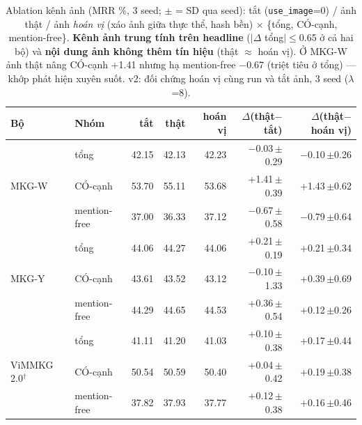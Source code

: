 \begin{table}[t]
\centering
\footnotesize
\setlength{\tabcolsep}{5pt}
\caption{Ablation kênh ảnh (MRR \%, 3 seed; $\pm$ = SD qua seed): tắt (\texttt{use\_image}=0) / ảnh
thật / ảnh \emph{hoán vị} (xáo ảnh giữa thực thể, hash bền) $\times$ \{tổng, CÓ-cạnh, mention-free\}.
\textbf{Kênh ảnh trung tính trên headline} ($|\Delta$ tổng$|\le$0.65 ở cả hai bộ) và \textbf{nội dung
ảnh không thêm tín hiệu} (thật $\approx$ hoán vị). Ở MKG-W ảnh thật nâng CÓ-cạnh +1.41 nhưng hạ
mention-free $-$0.67 (triệt tiêu ở tổng) --- khớp phát hiện xuyên suốt. v2: đối chứng hoán vị cùng run và tắt ảnh, 3 seed ($\lambda$=8).}
\label{tab:anh}
\begin{tabular}{l l r r r r r}
\toprule
Bộ & Nhóm & tắt & thật & hoán vị & $\Delta$(thật$-$tắt) & $\Delta$(thật$-$hoán vị) \\
\midrule
\multirow{3}{*}{MKG-W} & tổng & 42.15 & 42.13 & 42.23 & $-$0.03\,$\pm$0.29 & $-$0.10\,$\pm$0.26 \\
 & CÓ-cạnh & 53.70 & 55.11 & 53.68 & +1.41\,$\pm$0.39 & +1.43\,$\pm$0.62 \\
 & mention-free & 37.00 & 36.33 & 37.12 & $-$0.67\,$\pm$0.58 & $-$0.79\,$\pm$0.64 \\
\midrule
\multirow{3}{*}{MKG-Y} & tổng & 44.06 & 44.27 & 44.06 & +0.21\,$\pm$0.19 & +0.21\,$\pm$0.34 \\
 & CÓ-cạnh & 43.61 & 43.52 & 43.12 & $-$0.10\,$\pm$1.33 & +0.39\,$\pm$0.69 \\
 & mention-free & 44.29 & 44.65 & 44.53 & +0.36\,$\pm$0.54 & +0.12\,$\pm$0.26 \\
\midrule
\multirow{3}{*}{ViMMKG 2.0$^{\dagger}$} & tổng & 41.11 & 41.20 & 41.03 & +0.10\,$\pm$0.38 & +0.17\,$\pm$0.44 \\
 & CÓ-cạnh & 50.54 & 50.59 & 50.40 & +0.04\,$\pm$0.42 & +0.19\,$\pm$0.38 \\
 & mention-free & 37.82 & 37.93 & 37.77 & +0.12\,$\pm$0.38 & +0.16\,$\pm$0.46 \\
\bottomrule
\end{tabular}


\end{table}
